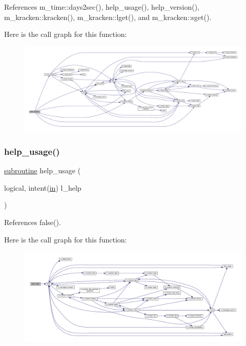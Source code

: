 References m\+\_\+time\+::days2sec(), help\+\_\+usage(), help\+\_\+version(), m\+\_\+kracken\+::kracken(), m\+\_\+kracken\+::lget(), and m\+\_\+kracken\+::sget().

Here is the call graph for this function\+:
\nopagebreak
\begin{figure}[H]
\begin{center}
\leavevmode
\includegraphics[width=350pt]{days2sec_8f90_ae9a288b1c1af3c0a7a6a4434e2d163c8_cgraph}
\end{center}
\end{figure}
\mbox{\label{days2sec_8f90_a3e09a3b52ee8fb04eeb93fe5761626a8}} 
\subsubsection{\texorpdfstring{help\+\_\+usage()}{help\_usage()}}
{\footnotesize\ttfamily \hyperlink{M__stopwatch_83_8txt_acfbcff50169d691ff02d4a123ed70482}{subroutine} help\+\_\+usage (\begin{DoxyParamCaption}\item[{logical, intent(\hyperlink{M__journal_83_8txt_afce72651d1eed785a2132bee863b2f38}{in})}]{l\+\_\+help }\end{DoxyParamCaption})}



References false().

Here is the call graph for this function\+:
\nopagebreak
\begin{figure}[H]
\begin{center}
\leavevmode
\includegraphics[width=350pt]{days2sec_8f90_a3e09a3b52ee8fb04eeb93fe5761626a8_cgraph}
\end{center}
\end{figure}
\mbox{\label{days2sec_8f90_a39c21619b08a3c22f19e2306efd7f766}} 
